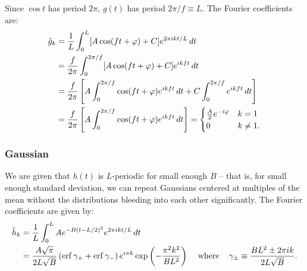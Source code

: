 \documentclass{article}
\theoremstyle{definition}
\renewcommand{\sp}[1]{\;\;\;\text{ #1 }\;\;\;}
\begin{document}
Since $\cos t$ has period $2\pi$, $g(t)$ has period $2\pi/f \equiv L$.
The Fourier coefficients are:
\begin{align*}
\tilde g_k
&= {1 \over L} \int_0^L [A \cos(ft + \varphi) + C]
e^{2\pi i k t / L} \, dt \\
&= {f \over 2\pi} \int_0^{2\pi/f} [A \cos(ft + \varphi) + C]
e^{i k f t} \, dt \\
&= {f \over 2\pi}
\left[
A \int_0^{2\pi/f} \cos(ft + \varphi)
e^{i k f t} \, dt
+ C  \int_0^{2\pi/f}
e^{i k f t} \, dt
\right]\\
&= {f \over 2\pi}
\left[
A \int_0^{2\pi/f} \cos(ft + \varphi)
e^{i k f t} \, dt
\right]
=
\begin{cases}
{A \over 2} e^{-i\varphi} & k = 1 \\
0 & k \not= 1.
\end{cases}
\end{align*}

\subsubsection{Gaussian}

We are given that $h(t)$ is $L$-periodic for small enough $B$ -- that is,
for small enough standard deviation, we can repeat Gaussians
centered at multiples of the mean without the distributions bleeding into
each other significantly. The Fourier coefficients are given by:
\begin{align*}
\tilde h_k &= {1 \over L} \int_0^L A e^{-B (t - L/2)^2}
e^{2\pi i k t / L} \, dt \\
&=
{A\sqrt\pi \over 2L \sqrt B}
\left(
    \erf \gamma_+ + \erf \gamma_-
\right)
e^{i\pi k}
\exp\left(
    -{\pi^2 k^2 \over B L^2}
\right)
\sp{where}
\gamma_{\pm} \equiv {BL^2 \pm 2\pi i k \over 2L \sqrt B}.
\end{align*}
\end{document}
